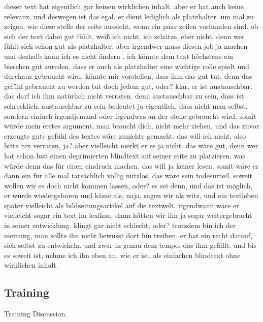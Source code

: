 \documentclass[conference]{IEEEtran}
\begin{document}
dieser text hat eigentlich gar keinen wirklichen inhalt. aber er hat auch keine relevanz, und deswegen ist das egal. er dient lediglich als platzhalter. um mal zu zeigen, wie diese stelle der seite aussieht, wenn ein paar zeilen vorhanden sind. ob sich der text dabei gut fühlt, weiß ich nicht. ich schätze, eher nicht, denn wer fühlt sich schon gut als platzhalter. aber irgendwer muss diesen job ja machen und deshalb kann ich es nicht ändern . ich könnte dem text höchstens ein bisschen gut zureden, dass er auch als platzhalter eine wichtige rolle spielt und durchaus gebraucht wird. könnte mir vorstellen, dass ihm das gut tut. denn das gefühl gebraucht zu werden tut doch jedem gut, oder? klar, er ist austauschbar. das darf ich ihm natürlich nicht verraten. denn austauschbar zu sein, dass ist schrecklich. austauschbar zu sein bedeutet ja eigentlich, dass nicht man selbst, sondern einfach irgendjemand oder irgendwas an der stelle gebraucht wird. somit würde mein erstes argument, man braucht dich, nicht mehr ziehen, und das zuvor erzeugte gute gefühl des textes wäre zunichte gemacht. das will ich nicht. also bitte nix verraten, ja? aber vielleicht merkt er es ja nicht. das wäre gut, denn wer hat schon lust einen deprimierten blindtext auf seiner seite zu platzieren. was würde denn das für einen eindruck machen. das will ja keiner lesen. somit wäre er dann ein für alle mal tatsächlich völlig nutzlos. das wäre sein todesurteil. soweit wollen wir es doch nicht kommen lassen, oder? es sei denn, und das ist möglich, er würde wiedergeboren und käme als, naja, sagen wir als witz, und ein textleben später vielleicht als bildzeitungsartikel auf die textwelt. irgendwann wäre er vielleicht sogar ein text im lexikon. dann hätten wir ihn ja sogar weitergebracht in seiner entwicklung. klingt gar nicht schlecht, oder? trotzdem bin ich der meinung, man sollte ihn nicht bewusst dort hin treiben. er hat ein recht darauf, sich selbst zu entwickeln. und zwar in genau dem tempo, das ihm gefällt. und bis es soweit ist, nehme ich ihn eben an, wie er ist. als einfachen blindtext ohne wirklichen inhalt.

\subsection{Training}
Training Discussion.
\end{document}
